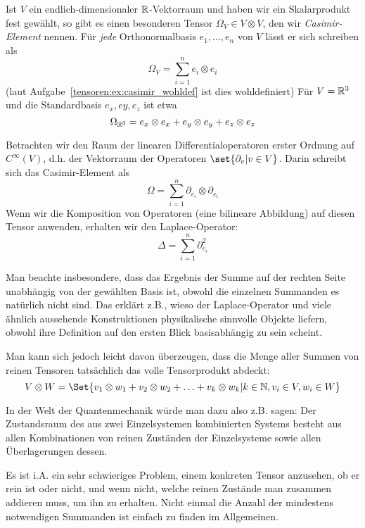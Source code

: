 \begin{example}\label{tensoren:casimir_element}
Ist $V$ ein endlich-dimensionaler $\mathbb{R}$-Vektorraum und haben wir ein Skalarprodukt fest gewählt, so gibt es einen besonderen Tensor $\Omega_V \in V\otimes V$, den wir \emph{Casimir-Element} nennen. Für \textit{jede} Orthonormalbasis $e_1, \ldots, e_n$ von $V$ lässt er sich schreiben als
\[\Omega_V = \sum_{i=1}^n e_i \otimes e_i\]
(laut Aufgabe~\ref{tensoren:ex:casimir_wohldef} ist dies wohldefiniert)
Für $V=\mathbb{R}^3$ und die Standardbasis $e_x, ey, e_z$ ist etwa
\[\Omega_{\mathbb{R}^3} = e_x\otimes e_x + e_y\otimes e_y + e_z\otimes e_z\]

Betrachten wir den Raum der linearen Differentialoperatoren erster Ordnung auf $C^\infty(V)$, d.h. der Vektorraum der Operatoren $\set{\partial_v | v\in V}$. Darin schreibt sich das Casimir-Element als
\[\Omega = \sum_{i=1}^n \partial_{e_i} \otimes \partial_{e_i}\]
Wenn wir die Komposition von Operatoren (eine bilineare Abbildung) auf diesen Tensor anwenden, erhalten wir den Laplace-Operator:
\[\Delta = \sum_{i=1}^n \partial_{e_i}^2\]

Man beachte insbesondere, dass das Ergebnis der Summe auf der rechten Seite unabhängig von der gewählten Basis ist, obwohl die einzelnen Summanden es natürlich nicht sind. Das erklärt z.B., wieso der Laplace-Operator und viele ähnlich aussehende Konstruktionen physikalische sinnvolle Objekte liefern, obwohl ihre Definition auf den ersten Blick basisabhängig zu sein scheint.
\end{example}

\begin{remark}
Man kann sich jedoch leicht davon überzeugen, dass die Menge aller Summen von reinen Tensoren tatsächlich das volle Tensorprodukt abdeckt:
\[V\otimes W = \Set{v_1\otimes w_1 + v_2\otimes w_2 + \ldots + v_k\otimes w_k | k\in\IN, v_i\in V, w_i\in W}\]

In der Welt der Quantenmechanik würde man dazu also z.B. sagen: Der Zustandsraum des aus zwei Einzelsystemen kombinierten Systems besteht aus allen Kombinationen von reinen Zuständen der Einzelsysteme sowie allen Überlagerungen dessen.

Es ist i.A. ein sehr schwieriges Problem, einem konkreten Tensor anzusehen, ob er rein ist oder nicht, und wenn nicht, welche reinen Zustände man zusammen addieren muss, um ihn zu erhalten. Nicht einmal die Anzahl der mindestens notwendigen Summanden ist einfach zu finden im Allgemeinen.
\end{remark}

